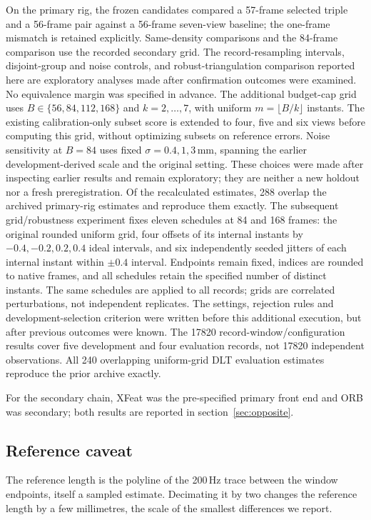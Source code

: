 \documentclass{iopjournal}
\begin{document}
On the primary rig, the frozen candidates compared a 57-frame selected
triple and a 56-frame pair against a 56-frame seven-view baseline; the
one-frame mismatch is retained explicitly. Same-density comparisons and the
84-frame comparison use the recorded secondary grid. The record-resampling
intervals, disjoint-group and noise controls, and robust-triangulation
comparison reported here are exploratory analyses made after confirmation
outcomes were examined. No equivalence margin was specified in advance.
The additional budget-cap grid uses $B\in\{56,84,112,168\}$ and
$k=2,\ldots,7$, with uniform $m=\lfloor B/k\rfloor$ instants. The existing
calibration-only subset score is extended to four, five and six views before
computing this grid, without optimizing subsets on reference errors. Noise
sensitivity at $B=84$ uses fixed $\sigma=0.4,1,3$\,mm, spanning the earlier
development-derived scale and the original setting. These choices were made
after inspecting earlier results and remain exploratory; they are neither a
new holdout nor a fresh preregistration. Of the recalculated estimates, 288
overlap the archived primary-rig estimates and reproduce them exactly.
The subsequent grid/robustness experiment fixes eleven schedules at 84 and
168 frames: the original rounded uniform grid, four offsets of its internal
instants by $-0.4,-0.2,0.2,0.4$ ideal intervals, and six independently seeded
jitters of each internal instant within $\pm0.4$ interval. Endpoints remain
fixed, indices are rounded to native frames, and all schedules retain the
specified number of distinct instants. The same schedules are applied to
all records; grids are correlated perturbations, not independent replicates.
The settings, rejection rules and development-selection criterion were written
before this additional execution, but after previous outcomes were known.
The 17820 record-window/configuration results cover five development and four
evaluation records, not 17820 independent observations. All 240 overlapping
uniform-grid DLT evaluation estimates reproduce the prior archive exactly.

For the secondary chain, XFeat was the pre-specified primary front end and
ORB was secondary; both results are reported in section~\ref{sec:opposite}.

\subsection{Reference caveat}
The reference length is the polyline of the 200\,Hz trace between the window
endpoints, itself a sampled estimate. Decimating it by two changes the
reference length by a few millimetres, the scale of the smallest differences
we report.
\end{document}
